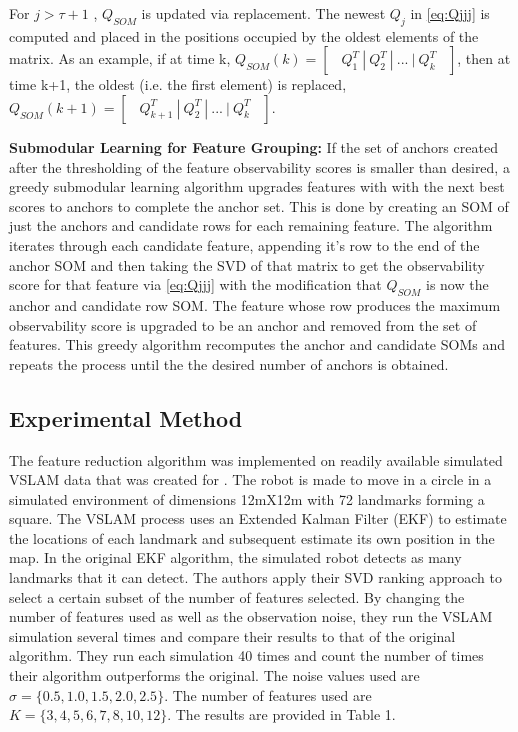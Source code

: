\documentclass[10pt,twocolumn,letterpaper]{article}
\begin{document}
For $j>\tau + 1$ , $Q_{SOM}$ is updated via replacement. The newest ${Q}_{j}$ in \eqref{eq:Qjjj} is computed and placed in the positions occupied by the oldest elements of the matrix. As an example, if at time k, $Q_{SOM}(k) = \begin{bmatrix} \ \ Q_1^T \ | \ Q_2^T \ | \ ... \ | \ Q_k^T  \ \ \end{bmatrix}$, then at time k+1, the oldest (i.e. the first element) is replaced, ${Q}_{SOM}(k+1) = \begin{bmatrix}\ \ Q_{k+1}^T \ | \ Q_2^T \ | \ ... \ | \ Q_k^T\ \ \end{bmatrix}$.

\textbf{Submodular Learning for Feature Grouping:} If the set of anchors created after the thresholding of the feature observability scores is smaller than desired, a greedy submodular learning algorithm upgrades features with with the next best scores to anchors to complete the anchor set. This is done by creating an SOM of just the anchors and candidate rows for each remaining feature. The algorithm iterates through each candidate feature, appending it's row to the end of the anchor SOM and then taking the SVD of that matrix to get the observability score for that feature via \eqref{eq:Qjjj} with the modification that $Q_{SOM}$ is now the anchor and candidate row SOM. The feature whose row produces the maximum observability score is upgraded to be an anchor and removed from the set of features. This greedy algorithm recomputes the anchor and candidate SOMs and repeats the process until the the desired number of anchors is obtained.

\subsection{Experimental Method}
The feature reduction algorithm was implemented on readily 
available simulated VSLAM data that was created for \cite{31}. 
The robot is made to move in a circle in a simulated environment of dimensions 12mX12m with 72 
landmarks forming a square. The VSLAM process uses an Extended Kalman Filter (EKF) to estimate the locations 
of each landmark and subsequent estimate its own position in the map. In the original EKF algorithm, the 
simulated robot detects as many landmarks that it can detect. The authors apply their SVD ranking approach
 to select a certain subset of the number of features selected. By changing the number of features used as 
 well as the observation noise, they run the VSLAM simulation several times and compare their results to 
 that of the original algorithm. They run each simulation 40 times and count the number of times their 
 algorithm outperforms the original. The noise values used are $\sigma=\{0.5, 1.0, 1.5, 2.0, 2.5\} $. 
The number of features used are $ K = \{ 3, 4, 5, 6, 7, 8, 10, 12 \}$. 
The results are provided in Table 1. 
\end{document}
